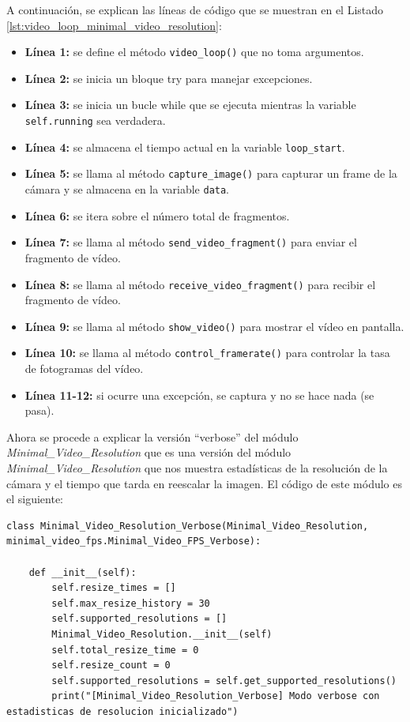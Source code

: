 A continuación, se explican las líneas de código que se muestran en el Listado \ref{lst:video_loop_minimal_video_resolution}:
\begin{itemize}
    \item \textbf{Línea 1:} se define el método \texttt{video\_loop()} que no toma argumentos.
    \item \textbf{Línea 2:} se inicia un bloque try para manejar excepciones.
    \item \textbf{Línea 3:} se inicia un bucle while que se ejecuta mientras la variable \texttt{self.running} sea verdadera.
    \item \textbf{Línea 4:} se almacena el tiempo actual en la variable \texttt{loop\_start}.
    \item \textbf{Línea 5:} se llama al método \texttt{capture\_image()} para capturar un frame de la cámara y se almacena en la variable \texttt{data}.
    \item \textbf{Línea 6:} se itera sobre el número total de fragmentos.
    \item \textbf{Línea 7:} se llama al método \texttt{send\_video\_fragment()} para enviar el fragmento de vídeo.
    \item \textbf{Línea 8:} se llama al método \texttt{receive\_video\_fragment()} para recibir el fragmento de vídeo.
    \item \textbf{Línea 9:} se llama al método \texttt{show\_video()} para mostrar el vídeo en pantalla.
    \item \textbf{Línea 10:} se llama al método \texttt{control\_framerate()} para controlar la tasa de fotogramas del vídeo.
    \item \textbf{Línea 11-12:} si ocurre una excepción, se captura y no se hace nada (se pasa).
\end{itemize}
\vspace{\baselineskip}

Ahora se procede a explicar la versión ``verbose'' del módulo \textit{Minimal\_Video\_Resolution} que es una versión del módulo \textit{Minimal\_Video\_Resolution} que nos muestra estadísticas de la resolución de la cámara y el tiempo que tarda en reescalar la imagen. El código de este módulo es el siguiente:
\begin{lstlisting}[style=pythonstyle, caption={Comienzo del módulo \textit{Minimal\_Video\_Resolution\_verbose} y su inicialización.}, label={lst:comienzo_minimal_video_resolution_verbose}]
class Minimal_Video_Resolution_Verbose(Minimal_Video_Resolution, minimal_video_fps.Minimal_Video_FPS_Verbose):
    
    def __init__(self):
        self.resize_times = []
        self.max_resize_history = 30
        self.supported_resolutions = []
        Minimal_Video_Resolution.__init__(self)
        self.total_resize_time = 0
        self.resize_count = 0
        self.supported_resolutions = self.get_supported_resolutions()
        print("[Minimal_Video_Resolution_Verbose] Modo verbose con estadisticas de resolucion inicializado")
\end{lstlisting}
\vspace{\baselineskip}


